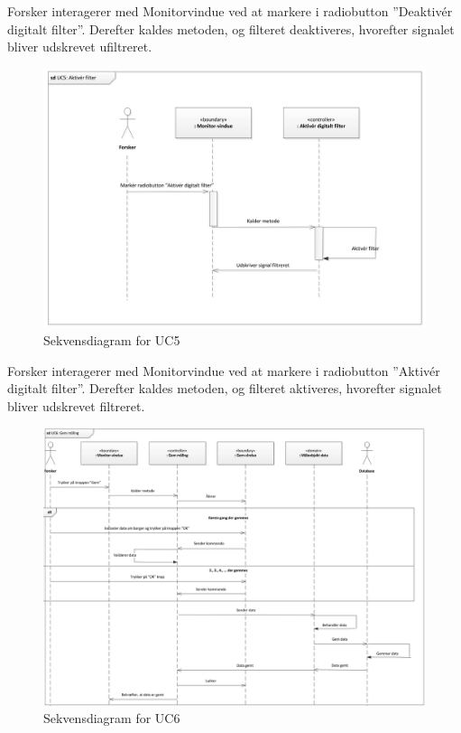 Forsker interagerer med Monitorvindue ved at markere i radiobutton ”Deaktivér digitalt filter”. Derefter kaldes metoden, og filteret deaktiveres, hvorefter signalet bliver udskrevet ufiltreret.

\begin{figure}[H]
	\centering
	\includegraphics[width=1\textwidth]{Figurer/Snip20151104_35}
	\caption{Sekvensdiagram for UC5}
\end{figure}

Forsker interagerer med Monitorvindue ved at markere i radiobutton ”Aktivér digitalt filter”. Derefter kaldes metoden, og filteret aktiveres, hvorefter signalet bliver udskrevet filtreret.

\begin{figure}[H]
	\centering
	\includegraphics[width=1\textwidth]{Figurer/Snip20151104_36}
	\caption{Sekvensdiagram for UC6}
\end{figure}

